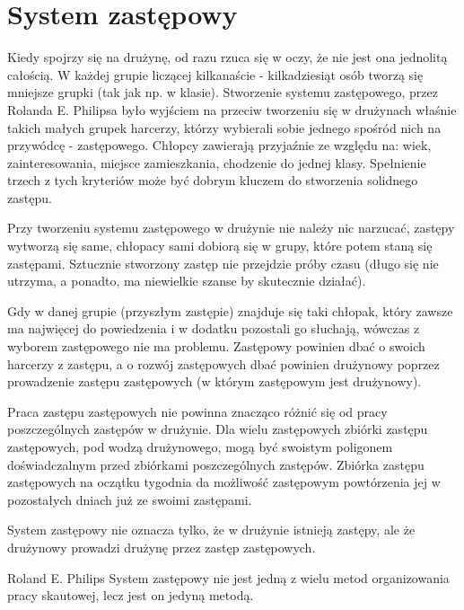 \chapter{System zastępowy}

Kiedy  spojrzy się na  drużynę, od  razu rzuca  się w  oczy,  że nie jest ona jednolitą całością. W każdej grupie liczącej kilkanaście - kilkadziesiąt osób tworzą się  mniejsze  grupki (tak jak np. w  klasie). Stworzenie systemu zastępowego, przez Rolanda E. Philipsa było wyjściem na przeciw tworzeniu  się w drużynach właśnie takich małych grupek harcerzy, którzy wybierali sobie jednego spośród nich na przywódcę - zastępowego. Chłopcy zawierają  przyjaźnie  ze względu na: wiek, zainteresowania,  miejsce  zamieszkania, chodzenie do jednej klasy. Spełnienie trzech z tych kryteriów może być dobrym kluczem  do stworzenia  solidnego zastępu. 
	
Przy tworzeniu systemu zastępowego w drużynie nie należy nic narzucać, zastępy wytworzą się same, chłopacy sami dobiorą się w grupy, które potem staną  się zastępami. Sztucznie stworzony zastęp nie przejdzie próby czasu (długo się nie utrzyma, a ponadto, ma niewielkie szanse by skutecznie działać).

Gdy w danej grupie (przyszłym  zastępie)  znajduje  się  taki chłopak, który  zawsze ma najwięcej do powiedzenia  i  w  dodatku  pozostali  go  słuchają, wówczas z wyborem zastępowego nie ma problemu. Zastępowy powinien dbać o swoich harcerzy z zastępu,  a o rozwój zastępowych dbać powinien drużynowy poprzez prowadzenie zastępu zastępowych (w którym zastępowym jest drużynowy).

Praca zastępu zastępowych  nie powinna znacząco różnić się od pracy poszczególnych zastępów  w  drużynie. Dla wielu zastępowych zbiórki zastępu zastępowych, pod wodzą  drużynowego, mogą być swoistym poligonem doświadczalnym przed zbiórkami  poszczególnych zastępów. Zbiórka zastępu zastępowych na  oczątku tygodnia da możliwość zastępowym powtórzenia jej w  pozostałych dniach już ze  swoimi  zastępami.

System zastępowy nie oznacza tylko, że w drużynie istnieją zastępy, ale że drużynowy prowadzi drużynę przez zastęp zastępowych.

\begin{aquote}{Roland E. Philips}
  System  zastępowy  nie  jest  jedną  z  wielu  metod organizowania  pracy  skautowej, lecz jest  on  jedyną  metodą.
 \end{aquote}
